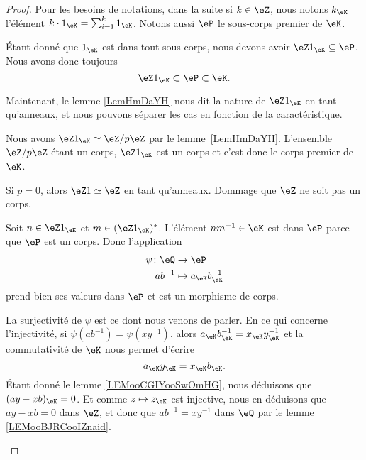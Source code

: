 \begin{proof}

	Pour les besoins de notations, dans la suite si \( k\in \eZ\), nous notons \( k_{\eK}\) l'élément \( k\cdot 1_{\eK}=\sum_{i=1}^k1_{\eK}\). Notons aussi \( \eP\) le sous-corps premier de \( \eK\).

	Étant donné que \( 1_{\eK}\) est dans tout sous-corps, nous devons avoir \( \eZ 1_{\eK}\subseteq \eP\). Nous avons donc toujours
	\begin{equation}
		\eZ 1_{\eK}\subset \eP\subset \eK.
	\end{equation}

	Maintenant, le lemme \ref{LemHmDaYH} nous dit la nature de \( \eZ 1_{\eK}\) en tant qu'anneaux, et nous pouvons séparer les cas en fonction de la caractéristique.
	\begin{subproof}
		\spitem[Si \( p>0\)]
		Nous avons \( \eZ 1_{\eK}\simeq\eZ/p\eZ\) par le lemme~\ref{LemHmDaYH}. L'ensemble \( \eZ/p\eZ\) étant un corps, \( \eZ 1_{\eK} \) est un corps et c'est donc le corps premier de \( \eK\).

		\spitem[Si \( p=0\)]
		Si \( p=0\), alors \( \eZ 1\simeq \eZ\) en tant qu'anneaux. Dommage que \( \eZ\) ne soit pas un corps.

		Soit \( n\in \eZ 1_{\eK}\) et \( m\in (\eZ 1_{\eK})^*\). L'élément \( nm^{-1}\in \eK\) est dans \( \eP\) parce que \( \eP\) est un corps. Donc l'application
		\begin{equation}
			\begin{aligned}
				\psi\colon \eQ & \to \eP                     \\
				ab^{-1}        & \mapsto a_{\eK}b_{\eK}^{-1}
			\end{aligned}
		\end{equation}
		prend bien ses valeurs dans \( \eP\) et est un morphisme de corps.

		La surjectivité de \( \psi\) est ce dont nous venons de parler. En ce qui concerne l'injectivité, si \( \psi(ab^{-1})=\psi(xy^{-1})\), alors \( a_{\eK}b_{\eK}^{-1}=x_{\eK}y_{\eK}^{-1}\) et la commutativité de \( \eK\) nous permet d'écrire
		\begin{equation}
			a_{\eK}y_{\eK}=x_{\eK}b_{\eK}.
		\end{equation}
		Étant donné le lemme \ref{LEMooCGIYooSwOmHG}, nous déduisons que \( (ay-xb)_{\eK}=0\). Et comme \( z\mapsto z_{\eK}\) est injective, nous en déduisons que \( ay-xb=0\) dans \( \eZ\), et donc que \( ab^{-1}=xy^{-1}\) dans \( \eQ\) par le lemme \ref{LEMooBJRCooIZnaid}.
	\end{subproof}
\end{proof}

